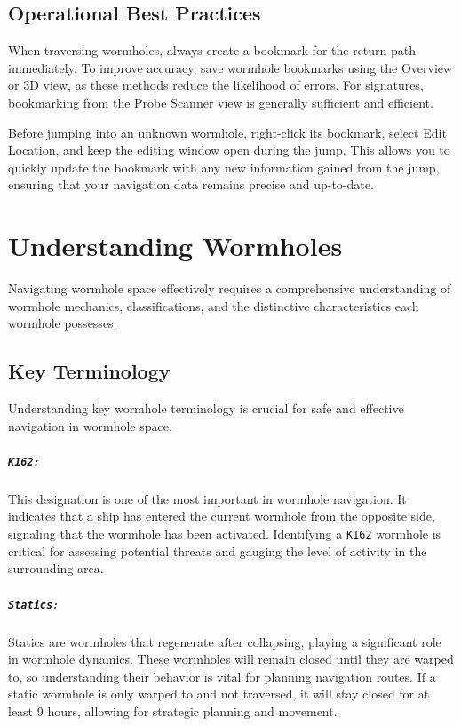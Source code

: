 \documentclass[a4paper,12pt]{report}
\begin{document}
\section{Operational Best Practices}

When traversing wormholes, always create a bookmark for the return path immediately. To improve accuracy, save wormhole bookmarks using the Overview or 3D view, as these methods reduce the likelihood of errors. For signatures, bookmarking from the Probe Scanner view is generally sufficient and efficient.

Before jumping into an unknown wormhole, right-click its bookmark, select Edit Location, and keep the editing window open during the jump. This allows you to quickly update the bookmark with any new information gained from the jump, ensuring that your navigation data remains precise and up-to-date.

\chapter{Understanding Wormholes}

Navigating wormhole space effectively requires a comprehensive understanding of wormhole mechanics, classifications, and the distinctive characteristics each wormhole possesses.

\section{Key Terminology}

Understanding key wormhole terminology is crucial for safe and effective navigation in wormhole space.

\paragraph{\texttt{K162}:} This designation is one of the most important in wormhole navigation. It indicates that a ship has entered the current wormhole from the opposite side, signaling that the wormhole has been activated. Identifying a \texttt{K162} wormhole is critical for assessing potential threats and gauging the level of activity in the surrounding area.

\paragraph{\texttt{Statics}:} Statics are wormholes that regenerate after collapsing, playing a significant role in wormhole dynamics. These wormholes will remain closed until they are warped to, so understanding their behavior is vital for planning navigation routes. If a static wormhole is only warped to and not traversed, it will stay closed for at least 9 hours, allowing for strategic planning and movement.
\end{document}
